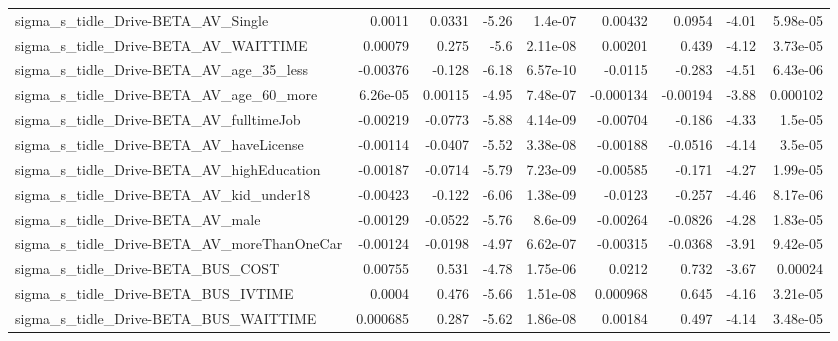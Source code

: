 \begin{tabular}{lrrrrrrrr}
sigma\_s\_tidle\_Drive-BETA\_AV\_Single                 &      0.0011 &       0.0331 &    -5.26 &  1.4e-07 &    0.00432 &      0.0954 &        -4.01 &      5.98e-05 \\
sigma\_s\_tidle\_Drive-BETA\_AV\_WAITTIME               &     0.00079 &        0.275 &     -5.6 & 2.11e-08 &    0.00201 &       0.439 &        -4.12 &      3.73e-05 \\
sigma\_s\_tidle\_Drive-BETA\_AV\_age\_35\_less            &    -0.00376 &       -0.128 &    -6.18 & 6.57e-10 &    -0.0115 &      -0.283 &        -4.51 &      6.43e-06 \\
sigma\_s\_tidle\_Drive-BETA\_AV\_age\_60\_more            &    6.26e-05 &      0.00115 &    -4.95 & 7.48e-07 &  -0.000134 &    -0.00194 &        -3.88 &      0.000102 \\
sigma\_s\_tidle\_Drive-BETA\_AV\_fulltimeJob            &    -0.00219 &      -0.0773 &    -5.88 & 4.14e-09 &   -0.00704 &      -0.186 &        -4.33 &       1.5e-05 \\
sigma\_s\_tidle\_Drive-BETA\_AV\_haveLicense            &    -0.00114 &      -0.0407 &    -5.52 & 3.38e-08 &   -0.00188 &     -0.0516 &        -4.14 &       3.5e-05 \\
sigma\_s\_tidle\_Drive-BETA\_AV\_highEducation          &    -0.00187 &      -0.0714 &    -5.79 & 7.23e-09 &   -0.00585 &      -0.171 &        -4.27 &      1.99e-05 \\
sigma\_s\_tidle\_Drive-BETA\_AV\_kid\_under18            &    -0.00423 &       -0.122 &    -6.06 & 1.38e-09 &    -0.0123 &      -0.257 &        -4.46 &      8.17e-06 \\
sigma\_s\_tidle\_Drive-BETA\_AV\_male                   &    -0.00129 &      -0.0522 &    -5.76 &  8.6e-09 &   -0.00264 &     -0.0826 &        -4.28 &      1.83e-05 \\
sigma\_s\_tidle\_Drive-BETA\_AV\_moreThanOneCar         &    -0.00124 &      -0.0198 &    -4.97 & 6.62e-07 &   -0.00315 &     -0.0368 &        -3.91 &      9.42e-05 \\
sigma\_s\_tidle\_Drive-BETA\_BUS\_COST                  &     0.00755 &        0.531 &    -4.78 & 1.75e-06 &     0.0212 &       0.732 &        -3.67 &       0.00024 \\
sigma\_s\_tidle\_Drive-BETA\_BUS\_IVTIME                &      0.0004 &        0.476 &    -5.66 & 1.51e-08 &   0.000968 &       0.645 &        -4.16 &      3.21e-05 \\
sigma\_s\_tidle\_Drive-BETA\_BUS\_WAITTIME              &    0.000685 &        0.287 &    -5.62 & 1.86e-08 &    0.00184 &       0.497 &        -4.14 &      3.48e-05 \\

\end{tabular}

